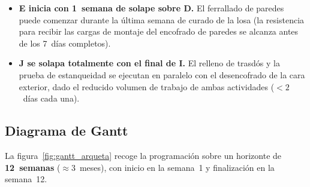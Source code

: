 \begin{notabox}
  \begin{itemize}[leftmargin=1.2em, itemsep=2pt]
    \item[*] \textbf{E inicia con 1~semana de solape sobre D.}
      El ferrallado de paredes puede comenzar durante la
      última semana de curado de la losa (la resistencia
      para recibir las cargas de montaje del encofrado de
      paredes se alcanza antes de los 7~días completos).
    \item[\dag] \textbf{J se solapa totalmente con el final de I.}
      El relleno de trasdós y la prueba de estanqueidad
      se ejecutan en paralelo con el desencofrado de la cara
      exterior, dado el reducido volumen de trabajo de ambas
      actividades ($< 2$~días cada una).
  \end{itemize}
\end{notabox}

\subsection{Diagrama de Gantt}
\label{subsec:gantt_arqueta}

La figura~\ref{fig:gantt_arqueta} recoge la programación sobre un
horizonte de \textbf{12~semanas} ($\approx 3$~meses), con inicio en
la semana~1 y finalización en la semana~12.

